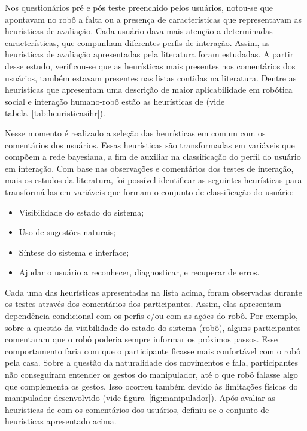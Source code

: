 Nos questionários pré e pós teste preenchido pelos usuários, notou-se que apontavam no robô a falta ou a presença de características que representavam as heurísticas de avaliação. Cada usuário dava mais atenção a determinadas características, que compunham diferentes perfis de interação. Assim, as heurísticas de avaliação apresentadas pela literatura foram estudadas. A partir desse estudo, verificou-se que as heurísticas mais presentes nos comentários dos usuários, também estavam presentes nas listas contidas na literatura. Dentre as heurísticas que apresentam uma descrição de maior aplicabilidade em robótica social e interação humano-robô estão as heurísticas de  (vide tabela~\ref{tab:heuristicasihr}).

Nesse momento é realizado a seleção das heurísticas em comum com os comentários dos usuários. Essas heurísticas são transformadas em variáveis que compõem a rede bayesiana, a fim de auxiliar na classificação do perfil do usuário em interação. Com base nas observações e comentários dos testes de interação, mais os estudos da literatura, foi possível identificar as seguintes heurísticas para transformá-las em variáveis que formam o conjunto de classificação do usuário:

\begin{itemize}
	\item Visibilidade do estado do sistema;
	\item Uso de sugestões naturais;
	\item Síntese do sistema e interface;
	\item Ajudar o usuário a reconhecer, diagnosticar, e recuperar de erros.
\end{itemize}

Cada uma das heurísticas apresentadas na lista acima, foram observadas durante os testes através dos comentários dos participantes. Assim, elas apresentam dependência condicional com os perfis e/ou com as ações do robô. Por exemplo, sobre a questão da visibilidade do estado do sistema (robô), alguns participantes comentaram que o robô poderia sempre informar os próximos passos. Esse comportamento faria com que o participante ficasse mais confortável com o robô pela casa. Sobre a questão da naturalidade dos movimentos e fala, participantes não conseguiram entender os gestos do manipulador, até o que robô falasse algo que complementa os gestos. Isso ocorreu também devido às limitações físicas do manipulador desenvolvido (vide figura~\ref{fig:manipulador}). Após avaliar as heurísticas de \textcite{clarkson:2007} com os comentários dos usuários, definiu-se o conjunto de heurísticas apresentado acima.

